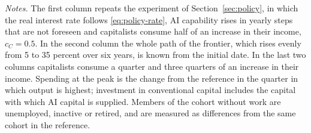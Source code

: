 \begin{table}[htbp]
\par\smallskip\begin{minipage}{\linewidth}\footnotesize\emph{Notes.} The first column repeats the experiment of Section~\ref{sec:policy}, in which the real interest rate follows \eqref{eq:policy-rate}, AI capability rises in yearly steps that are not foreseen and capitalists consume half of an increase in their income, $c_C=0.5$. In the second column the whole path of the frontier, which rises evenly from 5 to 35 percent over six years, is known from the initial date. In the last two columns capitalists consume a quarter and three quarters of an increase in their income. Spending at the peak is the change from the reference in the quarter in which output is highest; investment in conventional capital includes the capital with which AI capital is supplied. Members of the cohort without work are unemployed, inactive or retired, and are measured as differences from the same cohort in the reference.\end{minipage}
\end{table}
